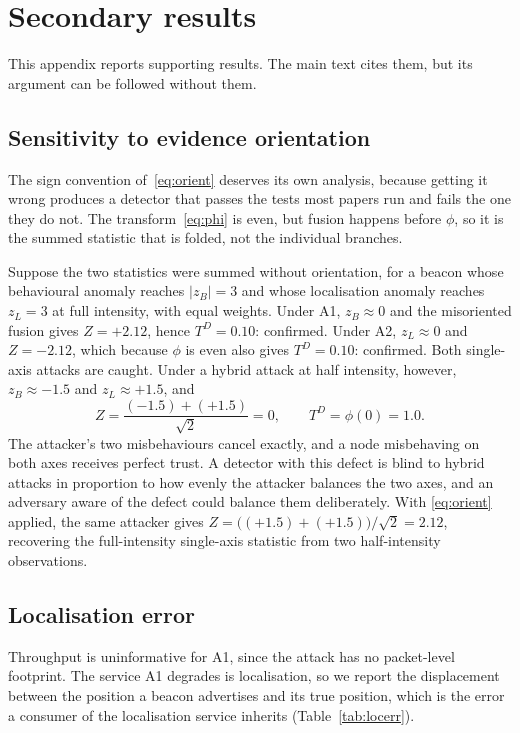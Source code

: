 \appendix
\section{Secondary results}
\label{sec:appendix}

This appendix reports supporting results. The main text cites them, but its argument can be followed without them.

\subsection{Sensitivity to evidence orientation}
\label{sec:orientation}

The sign convention of~\eqref{eq:orient} deserves its own analysis, because
getting it wrong produces a detector that passes the tests most papers run and
fails the one they do not. The transform~\eqref{eq:phi} is even, but fusion
happens before $\phi$, so it is the summed statistic that is folded, not the
individual branches.

Suppose the two statistics were summed without orientation, for a beacon whose
behavioural anomaly reaches $|z_B| = 3$ and whose localisation anomaly reaches
$z_L = 3$ at full intensity, with equal weights. Under A1, $z_B \approx 0$ and
the misoriented fusion gives $Z = +2.12$, hence $T^D = 0.10$: confirmed. Under
A2, $z_L \approx 0$ and $Z = -2.12$, which because $\phi$ is even also gives
$T^D = 0.10$: confirmed. Both single-axis attacks are caught. Under a hybrid
attack at half intensity, however, $z_B \approx -1.5$ and $z_L \approx +1.5$,
and
\begin{equation}
\label{eq:cancel}
Z = \frac{(-1.5) + (+1.5)}{\sqrt2} = 0, \qquad T^D = \phi(0) = 1.0.
\end{equation}
The attacker's two misbehaviours cancel exactly, and a node misbehaving on both
axes receives perfect trust. A detector with this defect is blind to hybrid
attacks in proportion to how evenly the attacker balances the two axes, and an
adversary aware of the defect could balance them deliberately. With
\eqref{eq:orient} applied, the same attacker gives
$Z = \bigl((+1.5) + (+1.5)\bigr)/\sqrt2 = 2.12$, recovering the full-intensity
single-axis statistic from two half-intensity observations.


\subsection{Localisation error}
\label{sec:locerr}

Throughput is uninformative for A1, since the attack has no packet-level
footprint. The service A1 degrades is localisation, so we report the
displacement between the position a beacon advertises and its true position,
which is the error a consumer of the localisation service inherits
(Table~\ref{tab:locerr}).

